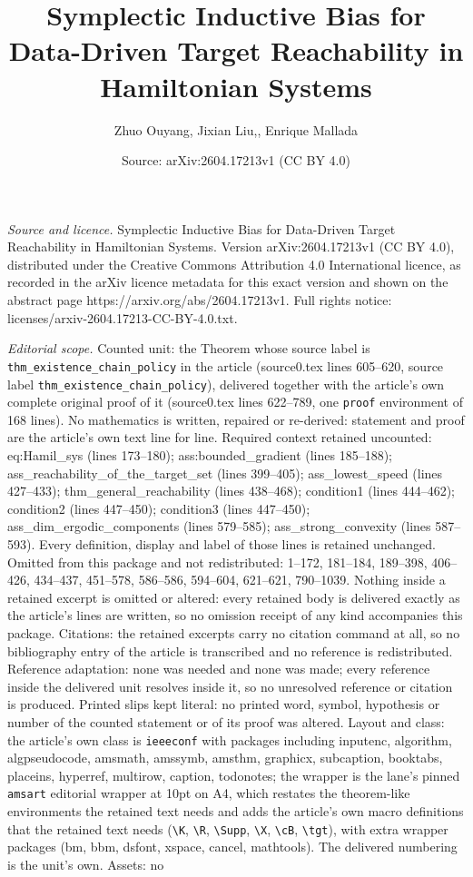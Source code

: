 \documentclass[10pt,a4paper]{amsart}
\title[Symplectic Inductive Bias for Data-Driven Target Reachabilit]{Symplectic Inductive Bias for Data-Driven Target Reachability in Hamiltonian Systems}
\author{Zhuo Ouyang, Jixian Liu,, Enrique Mallada}
\date{Source: arXiv:2604.17213v1 (CC BY 4.0)}
\begin{document}
\maketitle

\noindent\emph{Source and licence.} Symplectic Inductive Bias for Data-Driven Target Reachability in Hamiltonian Systems. Version arXiv:2604.17213v1 (CC BY 4.0), distributed under the Creative Commons Attribution 4.0 International licence, as recorded in the arXiv licence metadata for this exact version and shown on the abstract page https://arxiv.org/abs/2604.17213v1. Full rights notice: licenses/arxiv-2604.17213-CC-BY-4.0.txt.\par\smallskip

\noindent\textit{Editorial scope.} Counted unit: the Theorem whose source label is \texttt{thm\_existence\_chain\_policy} in the article (source0.tex lines 605--620, source label \texttt{thm\_existence\_chain\_policy}), delivered together with the article's own complete original proof of it (source0.tex lines 622--789, one \texttt{proof} environment of 168 lines). No mathematics is written, repaired or re-derived: statement and proof are the article's own text line for line. Required context retained uncounted: eq:Hamil\_sys (lines 173--180); ass:bounded\_gradient (lines 185--188); ass\_reachability\_of\_the\_target\_set (lines 399--405); ass\_lowest\_speed (lines 427--433); thm\_general\_reachability (lines 438--468); condition1 (lines 444--462); condition2 (lines 447--450); condition3 (lines 447--450); ass\_dim\_ergodic\_components (lines 579--585); ass\_strong\_convexity (lines 587--593). Every definition, display and label of those lines is retained unchanged. Omitted from this package and not redistributed: 1--172, 181--184, 189--398, 406--426, 434--437, 451--578, 586--586, 594--604, 621--621, 790--1039. Nothing inside a retained excerpt is omitted or altered: every retained body is delivered exactly as the article's lines are written, so no omission receipt of any kind accompanies this package. Citations: the retained excerpts carry no citation command at all, so no bibliography entry of the article is transcribed and no reference is redistributed. Reference adaptation: none was needed and none was made; every reference inside the delivered unit resolves inside it, so no unresolved reference or citation is produced. Printed slips kept literal: no printed word, symbol, hypothesis or number of the counted statement or of its proof was altered. Layout and class: the article's own class is \texttt{ieeeconf} with packages including inputenc, algorithm, algpseudocode, amsmath, amssymb, amsthm, graphicx, subcaption, booktabs, placeins, hyperref, multirow, caption, todonotes; the wrapper is the lane's pinned \texttt{amsart} editorial wrapper at 10pt on A4, which restates the theorem-like environments the retained text needs and adds the article's own macro definitions that the retained text needs (\texttt{\textbackslash K}, \texttt{\textbackslash R}, \texttt{\textbackslash Supp}, \texttt{\textbackslash X}, \texttt{\textbackslash cB}, \texttt{\textbackslash tgt}), with extra wrapper packages (bm, bbm, dsfont, xspace, cancel, mathtools). The delivered numbering is the unit's own. Assets: no 
\end{document}
